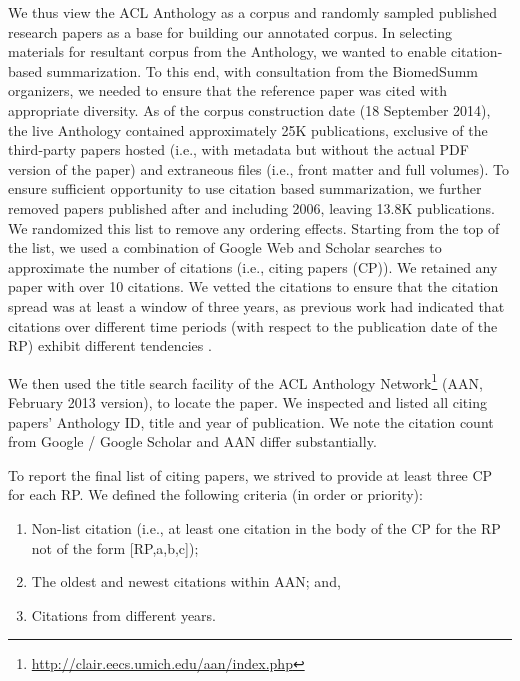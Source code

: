 \documentclass[11pt]{article}
\begin{document}
We thus view the ACL Anthology as a corpus and randomly sampled published research papers as a base for building our annotated corpus. In selecting materials for resultant corpus from the Anthology, we wanted to enable citation-based summarization. To this end, with consultation from the BiomedSumm organizers, we needed to ensure that the reference paper was cited with appropriate diversity. As of the corpus construction date (18 September 2014), the live Anthology contained approximately 25K publications, exclusive of the third-party papers hosted (i.e., with metadata but without the actual PDF version of the paper) and extraneous files (i.e., front matter and full volumes).  To ensure sufficient opportunity to use citation based summarization, we further removed papers published after and including 2006, leaving 13.8K publications.  We randomized this list to remove any ordering effects.  Starting from the top of the list, we used a combination of Google Web and Scholar searches to approximate the
number of citations (i.e., citing papers (CP)). We retained any paper with over 10 citations.  We vetted the citations to ensure that the citation spread was at least a window of three years, as previous work had indicated that citations over different time periods (with respect to the publication date of the RP) exhibit different tendencies \cite{N13-1067}.

We then used the title search facility of the ACL Anthology Network\footnote{\url{http://clair.eecs.umich.edu/aan/index.php}}
(AAN, February 2013 version), to locate the paper. We inspected and listed all citing papers' Anthology ID, title and year of publication. We note the citation count from Google / Google Scholar and AAN differ substantially.

To report the final list of citing papers, we strived to provide at least three CP for each RP. We defined the following
criteria (in order or priority):
\begin{enumerate}
\item Non-list citation (i.e., at least one citation in the body of
  the CP for the RP not of the form [RP,a,b,c]);
\vspace{-.3cm}
\item The oldest and newest
citations within AAN; and, 
\vspace{-.3cm}
\item Citations from different years. 
\end{enumerate}
\end{document}
